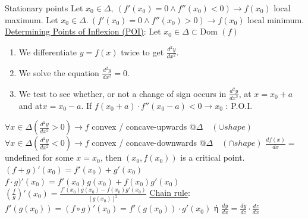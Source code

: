 \documentclass[12pt]{article}
\def\Dom{\text{Dom\ }} %
\begin{document}
\begin{flushleft}
	Stationary points \linebreak 
	\textbullet \quad Let $\displaystyle x_0 \in \Delta, \ (f'(x_0) = 0 \land f''(x_0) < 0) \rightarrow f(x_0)$ local maximum. \linebreak 
	\textbullet \quad Let $\displaystyle x_0 \in \Delta.\ (f'(x_0) = 0 \land f''(x_0) > 0 ) \rightarrow f(x_0)$ local minimum. \linebreak 
	\textbullet \quad \uline{Determining Points of Inflexion (POI)}: Let $\displaystyle x_0 \in \Delta \subset \Dom(f)$  
	\begin{enumerate}
	\item We differentiate $\displaystyle y=f(x)$ twice to get $\frac{d^2 y}{dx^2}$. 
	\item We solve the equation $\displaystyle \frac{d^2y}{dx^2}= 0$.
	\item We test to see whether, or not a change of sign occurs in $\displaystyle \frac{d^2y}{dx^2}$, at $x=x_0+a$ and at$x=x_0 -a$. If $f(x_0 + a) \cdot f''(x_0-a) < 0 \rightarrow x_0$  :  P.O.I. 
	\end{enumerate}
		\textbullet \quad $\displaystyle \forall x\in \Delta (\frac{d^2y}{dx^2} > 0) \rightarrow f$ convex / concave-upwards $\displaystyle @ \Delta \quad (\cup shape)$ \linebreak 
	\textbullet \quad $\displaystyle \forall x\in \Delta (\frac{d^2y}{dx^2} < 0) \rightarrow f$ convex / concave-downwards $\displaystyle @ \Delta \quad (\cap shape)$ \linebreak 
	\textbullet \quad $\displaystyle \frac{df(x)}{dx} = $ undefined for some $x=x_0$, then $\left(x_0, f(x_0)\right)$ is a critical point. \linebreak 
	\textbullet \quad $(\displaystyle f+g)'(x_0) = f'(x_0) + g'(x_0)$ \linebreak 
	\textbullet \quad $\displaystyle f\cdot g)'(x_0) = f'(x_0) g(x_0) + f(x_0) g'(x_0)$ \linebreak 
	\textbullet \quad $\displaystyle (\frac{f}{g})'(x_0) = \frac{f'(x_0)g(x_0) -f(x_0)g'(x_0)}{[g(x_0)]^2} $ \linebreak 
	\textbullet \quad \uline{Chain rule}: $\displaystyle f'(g(x_0)) = (f \circ g)'(x_0) = f'(g(x_0)) \cdot g'(x_0) $ \textgreek{ή} $\displaystyle \frac{dy}{dx} = \frac{dy}{dz} \cdot \frac{dz}{dx} $ \linebreak 
	

\end{flushleft}
\end{document}
